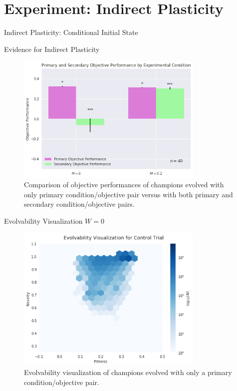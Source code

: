 \section{Experiment: Indirect Plasticity}

\begin{frame}{Indirect Plasticity: Conditional Initial State}

\end{frame}

\begin{frame}{Evidence for Indirect Plasticity}
\begin{figure}
    \centering
    \includegraphics[width=0.8\textwidth]{img/primary_secondary_performance}
 	\captionsetup{singlelinecheck=off,justification=raggedright}
  	\caption{Comparison of objective performances of champions evolved with only primary condition/objective pair versus with both primary and secondary condition/objective pairs.}
    \label{fig:ev_w0}
\end{figure}
\end{frame}

\begin{frame}{Evolvability Visualization $W=0$}
\begin{figure}
    \centering
    \includegraphics[width=0.8\textwidth]{img/ev_w0}
 	\captionsetup{singlelinecheck=off,justification=raggedright}
  	\caption{Evolvability visualization of champions evolved with only a primary condition/objective pair.}
    \label{fig:ev_w0}
\end{figure}
\end{frame}

